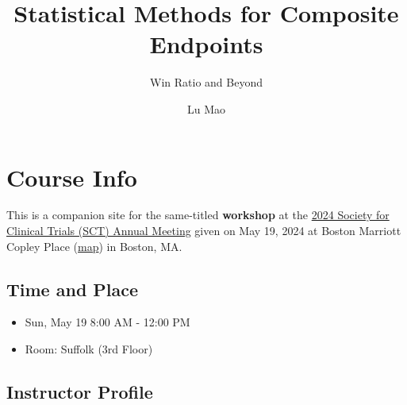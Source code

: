 \documentclass[
  letterpaper,
  DIV=11,
  numbers=noendperiod]{scrreprt}
\title{Statistical Methods for Composite Endpoints}
\subtitle{Win Ratio and Beyond}
\author{Lu Mao}
\date{}
\providecommand{\tightlist}{%
  \setlength{\itemsep}{0pt}\setlength{\parskip}{0pt}}\usepackage{longtable,booktabs,array}
\renewcommand*\contentsname{Table of contents}
\newcommand\contentsname{Table of contents}
\begin{document}
\maketitle
\ifdefined\Shaded\renewenvironment{Shaded}{\begin{tcolorbox}[interior hidden, enhanced, sharp corners, boxrule=0pt, frame hidden, breakable, borderline west={3pt}{0pt}{shadecolor}]}{\end{tcolorbox}}\fi

\renewcommand*\contentsname{Table of contents}
{
\hypersetup{linkcolor=}
\setcounter{tocdepth}{2}
\tableofcontents
}

\hypertarget{course-info}{%
\chapter*{Course Info}\label{course-info}}


This is a companion site for the same-titled \textbf{workshop} at the
\href{https://www.sctweb.org/meeting/}{2024 Society for Clinical Trials
(SCT) Annual Meeting} given on May 19, 2024 at Boston Marriott Copley
Place
(\href{https://www.google.com/maps/place/Boston+Marriott+Copley+Place/@42.3467509,-71.0815269,17z/data=!3m1!5s0x89e37a0d93723ac1:0x7edf0a3a678073b5!4m10!3m9!1s0x89e37a0de7e77a4b:0x1a77f7939c6472fb!5m3!1s2024-07-28!4m1!1i2!8m2!3d42.346747!4d-71.078952!16s\%2Fm\%2F0wfgs85?entry=ttu}{map})
in Boston, MA.

\hypertarget{time-and-place}{%
\section*{Time and Place}\label{time-and-place}}


\begin{itemize}
\tightlist
\item
  Sun, May 19 \textbar{} 8:00 AM - 12:00 PM
\item
  Room: Suffolk (3rd Floor)
\end{itemize}

\hypertarget{instructor-profile}{%
\section*{Instructor Profile}\label{instructor-profile}}
\end{document}
